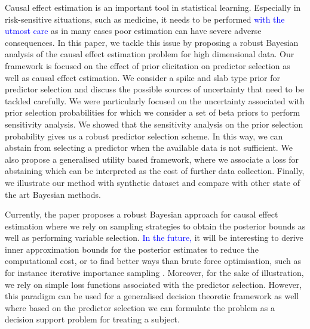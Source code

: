 \documentclass[preprint,12pt]{elsarticle}
\newcommand{\added}[1]{\textcolor{blue}{#1}}
\begin{document}
Causal effect estimation is an important tool in statistical learning.
Especially in risk-sensitive situations, such as medicine, it needs to
be performed \added{with the utmost care} as in many cases poor estimation can have severe adverse consequences.
In this paper, we tackle this issue by proposing a robust Bayesian analysis of the causal 
effect estimation problem for high dimensional data. Our 
framework is focused on the effect of prior elicitation on
predictor selection
as well as causal effect estimation. We consider a spike and slab type
prior for predictor selection and discuss the possible sources of uncertainty that
need to be tackled carefully. We were particularly focused on the uncertainty associated
with prior selection probabilities for which we consider a set of beta priors to perform
sensitivity analysis. We showed that the sensitivity analysis on the prior selection probability
gives us a robust predictor selection scheme. In this way, we can abstain from selecting
a predictor when the available data is not sufficient. We also propose a generalised
utility based framework, where we associate a loss for abstaining which can be interpreted 
as the cost of further data collection. Finally, we illustrate our method with synthetic dataset
and compare with other state of the art Bayesian methods. 


Currently, the paper proposes a robust Bayesian approach for causal effect estimation where
we rely on sampling strategies to obtain the posterior bounds as well as performing 
variable selection. \added{In the future,} it will be interesting to derive inner approximation bounds
for the posterior estimates to reduce the computational cost,
or to find better ways than brute force optimisation, such as for instance iterative importance sampling \citep{cruz22_importance}. Moreover, for the sake of
illustration, we rely on simple loss functions
associated with the predictor selection. However,
this paradigm can be used for a generalised
decision theoretic framework as well where based on
the predictor selection we can formulate the 
problem as a decision support problem for treating a subject.
\end{document}
